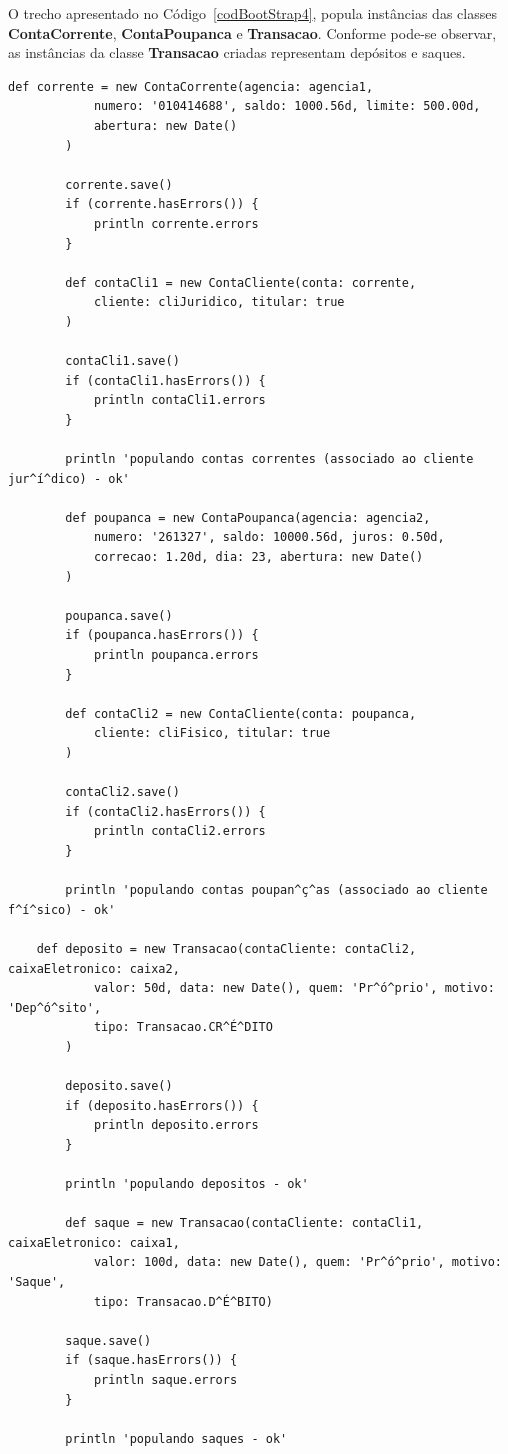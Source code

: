 \newpage


O  trecho  apresentado  no  Código~\ref{codBootStrap4},  popula  instâncias  das
classes  {\bf ContaCorrente},  {\bf ContaPoupanca}  e {\bf  Transacao}. Conforme
pode-se observar,  as instâncias da  classe {\bf Transacao}  criadas representam
depósitos e saques.
  
\begin{lstlisting}[caption={\bf BootStrap.groovy (4)}, frame = trBL, float=htbp,
    label=codBootStrap4]
        def corrente = new ContaCorrente(agencia: agencia1, 
            numero: '010414688', saldo: 1000.56d, limite: 500.00d,
            abertura: new Date()
        )
    
        corrente.save()
        if (corrente.hasErrors()) {
            println corrente.errors
        }

        def contaCli1 = new ContaCliente(conta: corrente, 
            cliente: cliJuridico, titular: true
        )
    
        contaCli1.save()
        if (contaCli1.hasErrors()) {
            println contaCli1.errors
        }
        
        println 'populando contas correntes (associado ao cliente jur^í^dico) - ok'
                
        def poupanca = new ContaPoupanca(agencia: agencia2, 
            numero: '261327', saldo: 10000.56d, juros: 0.50d,
            correcao: 1.20d, dia: 23, abertura: new Date()
        )
    
        poupanca.save()
        if (poupanca.hasErrors()) {
            println poupanca.errors
        }

        def contaCli2 = new ContaCliente(conta: poupanca, 
            cliente: cliFisico, titular: true
        )
    
        contaCli2.save()
        if (contaCli2.hasErrors()) {
            println contaCli2.errors
        }
        
        println 'populando contas poupan^ç^as (associado ao cliente f^í^sico) - ok'
        
	def deposito = new Transacao(contaCliente: contaCli2, caixaEletronico: caixa2, 
            valor: 50d, data: new Date(), quem: 'Pr^ó^prio', motivo: 'Dep^ó^sito',
            tipo: Transacao.CR^É^DITO
        )
        
        deposito.save()
        if (deposito.hasErrors()) {
            println deposito.errors
        }
        
        println 'populando depositos - ok'
        
        def saque = new Transacao(contaCliente: contaCli1, caixaEletronico: caixa1, 
            valor: 100d, data: new Date(), quem: 'Pr^ó^prio', motivo: 'Saque', 
            tipo: Transacao.D^É^BITO)
        
        saque.save()
        if (saque.hasErrors()) {
            println saque.errors
        }
        
        println 'populando saques - ok'
\end{lstlisting}

